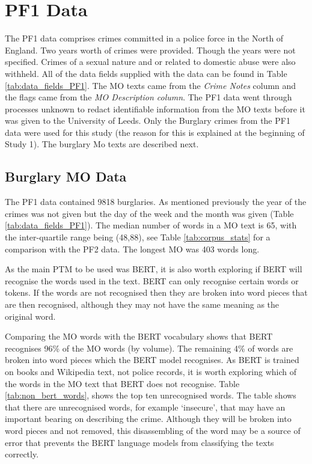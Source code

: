 \section{PF1 Data} The PF1 data comprises crimes committed in a police force in the North of England. Two years worth of crimes were provided. Though the years were not specified. Crimes of a sexual nature and or related to domestic abuse were also withheld. All of the data fields supplied with the data can be found in Table \ref{tab:data_fields_PF1}. The MO texts came from the \emph{Crime Notes} column and the flags came from the \emph{MO Description column}. The PF1 data went through processes unknown to redact identifiable information from the MO texts before it was given to the University of Leeds. Only the Burglary crimes from the PF1 data were used for this study (the reason for this is explained at the beginning of Study 1). The burglary Mo texts are described next.

\subsection{Burglary MO Data} The PF1 data contained 9818 burglaries. As mentioned previously the year of the crimes was not given but the day of the week and the month was given (Table \ref{tab:data_fields_PF1}). The median number of words in a MO text is 65, with the inter-quartile range being (48,88), see Table \ref{tab:corpus_stats} for a comparison with the PF2 data. The longest MO was 403 words long.


As the main PTM to be used was BERT, it is also worth exploring if BERT will recognise the words used in the text. BERT can only recognise certain words or tokens. If the words are not recognised then they are broken into word pieces that are then recognised, although they may not have the same meaning as the original word. 

Comparing the MO words with the BERT vocabulary shows that BERT recognises 96\% of the MO words (by volume). The remaining 4\% of words are broken into word pieces which the BERT model recognises. As BERT is trained on books and Wikipedia text, not police records, it is worth exploring which of the words in the MO text that BERT does not recognise. Table \ref{tab:non_bert_words}, shows the top ten unrecognised words. The table shows that there are unrecognised words, for example ‘insecure’, that may have an important bearing on describing the crime. Although they will be broken into word pieces and not removed, this disassembling of the word may be a source of error that prevents the BERT language models from classifying the texts correctly.



